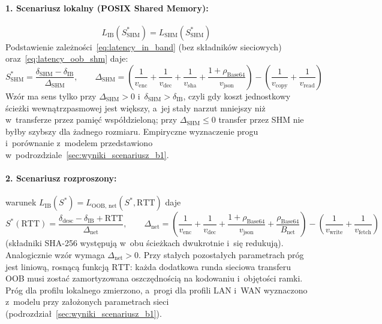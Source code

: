 \paragraph{1. Scenariusz lokalny (POSIX Shared Memory):}
\begin{equation}
L_{\text{IB}}(S^*_{\text{SHM}}) = L_{\text{SHM}}(S^*_{\text{SHM}})
\label{eq:crossover_shm_equality}
\end{equation}
Podstawienie zależności~\eqref{eq:latency_in_band} (bez składników sieciowych) oraz~\eqref{eq:latency_oob_shm} daje:
\begin{equation}
S^*_{\text{SHM}} = \frac{\delta_{\text{SHM}} - \delta_{\text{IB}}}{\Delta_{\text{SHM}}}, \qquad
\Delta_{\text{SHM}} = \left( \frac{1}{v_{\text{enc}}} + \frac{1}{v_{\text{dec}}} + \frac{1}{v_{\text{sha}}} + \frac{1+\rho_{\text{Base64}}}{v_{\text{json}}} \right) - \left( \frac{1}{v_{\text{copy}}} + \frac{1}{v_{\text{read}}} \right)
\label{eq:crossover_shm_formula}
\end{equation}
Wzór ma sens tylko przy $\Delta_{\text{SHM}} > 0$ i~$\delta_{\text{SHM}} > \delta_{\text{IB}}$, czyli gdy koszt jednostkowy ścieżki wewnątrzpasmowej jest większy, a~jej stały narzut mniejszy niż w~transferze przez pamięć współdzieloną; przy $\Delta_{\text{SHM}} \le 0$ transfer przez SHM nie byłby szybszy dla żadnego rozmiaru. Empiryczne wyznaczenie progu i~porównanie z~modelem przedstawiono w~podrozdziale~\ref{sec:wyniki_scenariusz_b1}.

\paragraph{2. Scenariusz rozproszony:} warunek $L_{\text{IB}}(S^*) = L_{\text{OOB, net}}(S^*, \text{RTT})$ daje
\begin{equation}
S^*(\text{RTT}) = \frac{\delta_{\text{desc}} - \delta_{\text{IB}} + \text{RTT}}{\Delta_{\text{net}}}, \qquad
\Delta_{\text{net}} = \left( \frac{1}{v_{\text{enc}}} + \frac{1}{v_{\text{dec}}} + \frac{1+\rho_{\text{Base64}}}{v_{\text{json}}} + \frac{\rho_{\text{Base64}}}{B_{\text{net}}} \right) - \left( \frac{1}{v_{\text{write}}} + \frac{1}{v_{\text{fetch}}} \right)
\label{eq:crossover_threshold_formula}
\end{equation}
(składniki SHA-256 występują w~obu ścieżkach dwukrotnie i~się redukują). Analogicznie wzór wymaga $\Delta_{\text{net}} > 0$. Przy stałych pozostałych parametrach próg jest liniową, rosnącą funkcją $\text{RTT}$: każda dodatkowa runda sieciowa transferu OOB musi zostać zamortyzowana oszczędnością na kodowaniu i~objętości ramki. Próg dla profilu lokalnego zmierzono, a~progi dla profili LAN i~WAN wyznaczono z~modelu przy założonych parametrach sieci (podrozdział~\ref{sec:wyniki_scenariusz_b1}).


